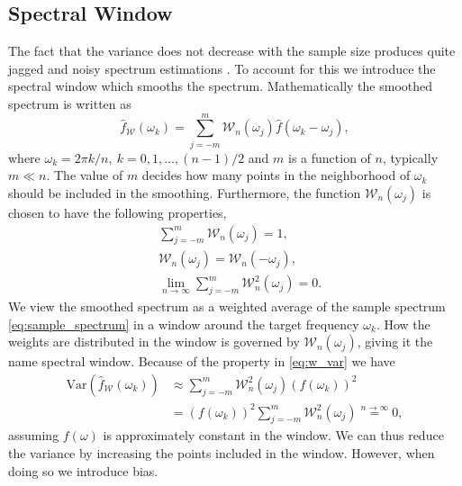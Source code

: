 \documentclass[a4paper, 10pt]{memoir}
\theoremstyle{plain}
\theoremstyle{definition}
\theoremstyle{remark}
\begin{document}
\subsection{Spectral Window}
The fact that the variance does not decrease with the sample size produces quite jagged and noisy spectrum estimations \cite{shumway}.
To account for this we introduce the spectral window which smooths the spectrum.
Mathematically the smoothed spectrum is written as
\begin{equation}\label{eq:smo_spec}
        \hat{f}_{\mathcal{W}}(\omega_k) = \sum_{j = -m}^{m} \mathcal{W}_n(\omega_j) \hat{f}(\omega_k - \omega_j),
\end{equation}
where $\omega_k = 2\pi k/n,\ k = 0,1, \hdots, (n-1)/2$ and $m$ is a function of $n$, typically $m \ll n$.
The value of $m$ decides how many points in the neighborhood of $\omega_k$ should be included in the smoothing.
Furthermore, the function $\mathcal{W}_n(\omega_j)$ is chosen to have the following properties,
\begin{align}
        &\sum_{j = -m}^{m}\mathcal{W}_n(\omega_j) = 1, \nonumber \\
        &\mathcal{W}_n(\omega_j) = \mathcal{W}_n(-\omega_j), \nonumber \\
        \label{eq:w_var}
        &\lim_{n \rightarrow \infty} \sum_{j = -m}^{m}\mathcal{W}_n^2(\omega_j) = 0.
\end{align}
We view the smoothed spectrum as a weighted average of the sample spectrum \eqref{eq:sample_spectrum} in a window around the target frequency $\omega_k$.
How the weights are distributed in the window is governed by $\mathcal{W}_n(\omega_j)$, giving it the name spectral window.
Because of the property in \eqref{eq:w_var} we have
\begin{align*}
        \text{Var}(\hat{f}_\mathcal{W}(\omega_k)) &\approx \sum_{j = -m}^{m}\mathcal{W}_n^2(\omega_j)(f(\omega_k))^2 \\
                                             &=(f(\omega_k))^2 \sum_{j = -m}^{m} \mathcal{W}_n^2(\omega_j) \overset{n \rightarrow \infty}{=} 0,
\end{align*}
assuming $f(\omega)$ is approximately constant in the window.
We can thus reduce the variance by increasing the points included in the window.
However, when doing so we introduce bias.
\end{document}
